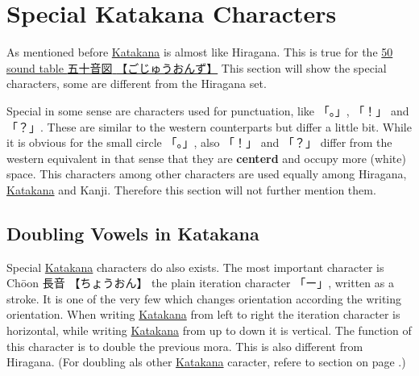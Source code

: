 \section{Special Katakana Characters}
\label{sec:SpecialKatakanaCharacters}


As mentioned before \hyperref[sec:Katakana]{Katakana} is almost like Hiragana.
This is true for the \hyperref[sec:50SoundTable]{50 sound table  {五十音図}
{【ごじゅうおんず】}} This section will show the special characters, some are
different from the Hiragana set.

Special in some sense are characters used for punctuation, like {「。」},
{「！」} and {「？」}.  These are similar to the western counterparts but
differ a little bit. While it is obvious for the small circle {「。」}, also
{「！」} and {「？」} differ from the western equivalent in that sense that
they are \textbf{centerd} and occupy more (white) space. This characters among
other characters are used equally among Hiragana,
\hyperref[sec:Katakana]{Katakana} and Kanji. Therefore this section will not
further mention them.


\subsection{Doubling Vowels in Katakana}
\label{subsec:DoublingVowelsInKatakana}
\label{subsec:DoublingVowels}


Special \hyperref[sec:Katakana]{Katakana} characters do also exists. The most
important character is Chōon {長音} {【ちょうおん】} the plain iteration
character {「ー」}, written as a stroke. It is one of the very few which
changes orientation according the writing orientation. When writing
\hyperref[sec:Katakana]{Katakana} from left to right the iteration character is
horizontal, while writing \hyperref[sec:Katakana]{Katakana} from up to down it
is vertical. The function of this character is to double the previous mora.
This is also different from Hiragana. (For doubling als other
\hyperref[sec:Katakana]{Katakana} caracter, refere to section
 on page \pageref{sec:Iteration}.)

